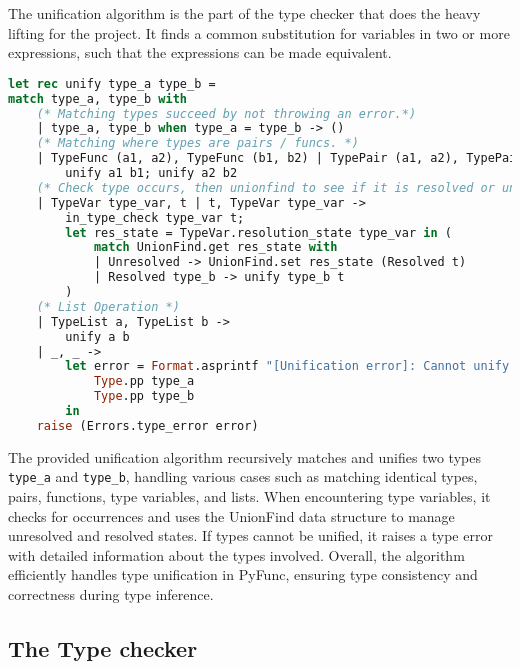 \documentclass{l4proj}
\begin{document}
The unification algorithm is the part of the type checker that does the heavy lifting for the project.
It finds a common substitution for variables in two or more expressions, such that the expressions can be made equivalent. 
\begin{lstlisting}[language=Caml, caption=PyFunc's unification algorithm.]
let rec unify type_a type_b = 
match type_a, type_b with
    (* Matching types succeed by not throwing an error.*)
    | type_a, type_b when type_a = type_b -> () 
    (* Matching where types are pairs / funcs. *)
    | TypeFunc (a1, a2), TypeFunc (b1, b2) | TypePair (a1, a2), TypePair (b1, b2) -> 
        unify a1 b1; unify a2 b2
    (* Check type occurs, then unionfind to see if it is resolved or unresolved. *)
    | TypeVar type_var, t | t, TypeVar type_var -> 
        in_type_check type_var t;
        let res_state = TypeVar.resolution_state type_var in (
            match UnionFind.get res_state with
            | Unresolved -> UnionFind.set res_state (Resolved t)
            | Resolved type_b -> unify type_b t
        )
    (* List Operation *)
    | TypeList a, TypeList b -> 
        unify a b
    | _, _ -> 
        let error = Format.asprintf "[Unification error]: Cannot unify %a with %a" 
            Type.pp type_a 
            Type.pp type_b 
        in 
    raise (Errors.type_error error)
\end{lstlisting}

The provided unification algorithm recursively matches and unifies two types \texttt{type\_a} and \texttt{type\_b}, handling various cases such as matching identical types, pairs, functions, type variables, and lists.
When encountering type variables, it checks for occurrences and uses the UnionFind data structure to manage unresolved and resolved states.
If types cannot be unified, it raises a type error with detailed information about the types involved.
Overall, the algorithm efficiently handles type unification in PyFunc, ensuring type consistency and correctness during type inference.

\subsection{The Type checker}
\label{sec:implementation-typechecker-rules}
\end{document}
